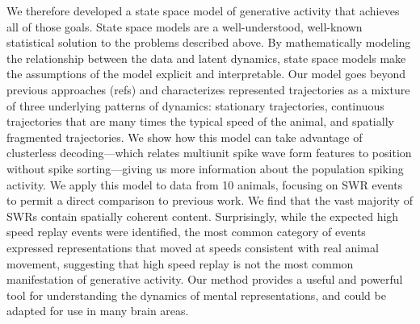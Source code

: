 \documentclass[times, twoside]{zHenriquesLab-StyleBioRxiv}
\begin{document}
We therefore developed a state space model of generative activity that achieves all of those goals. State space models are a well-understood, well-known statistical solution to the problems described above. By mathematically modeling the relationship between the data and latent dynamics, state space models make the assumptions of the model explicit and interpretable. Our model goes beyond previous approaches (refs) and characterizes represented trajectories as a mixture of three underlying patterns of dynamics: stationary trajectories, continuous trajectories that are many times the typical speed of the animal, and spatially fragmented trajectories. We show how this model can take advantage of clusterless decoding---which relates multiunit spike wave form features to position without spike sorting---giving us more information about the population spiking activity. We apply this model to data from 10 animals, focusing on SWR events to permit a direct comparison to previous work. We find that the vast majority of SWRs contain spatially coherent content. Surprisingly, while the expected high speed replay events were identified, the most common category of events expressed representations that moved at speeds consistent with real animal movement, suggesting that high speed replay is not the most common manifestation of generative activity. Our method provides a useful and powerful tool for understanding the dynamics of mental representations, and could be adapted for use in many brain areas. 
\end{document}
